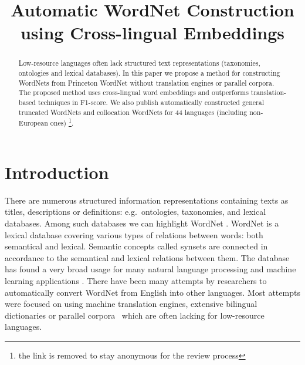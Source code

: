 \documentclass[conference]{IEEEtran}
\newcommand{\LanguagesN}{44 }
\begin{document}
	\title{Automatic WordNet Construction using Cross-lingual Embeddings}
	\date{}%
	
	\author{
}
	\maketitle
	
	\begin{abstract}
		Low-resource languages often lack structured text representations (taxonomies, ontologies and lexical databases). In this paper we propose a method for constructing WordNets from Princeton WordNet without translation engines or parallel corpora. The proposed method uses cross-lingual word embeddings and outperforms translation-based techniques in F1-score. We also publish automatically constructed general truncated WordNets and collocation WordNets for \LanguagesN languages (including non-European ones) \footnote{the link is removed to stay anonymous for the review process}.
	\end{abstract}
	
	\section{Introduction}
	
	There are numerous structured information representations containing texts as titles, descriptions or definitions: e.g.\ ontologies, taxonomies, and lexical databases. Among such databases we can highlight WordNet \cite{wordnet}. WordNet is a lexical database covering various types of relations between words: both semantical and lexical. Semantic concepts called synsets are connected in accordance to the semantical and lexical relations between them. The database has found a very broad usage for many natural language processing and machine learning applications \cite{kutuzovgraphwordnet,mao-semeval}.
	There have been many attempts by researchers to automatically convert WordNet from English into other languages. Most attempts were focused on using machine translation engines, extensive bilingual dictionaries or parallel corpora~\cite{Khodak2017,NEALE18.1030} which are often lacking for low-resource languages.
	
\end{document}
